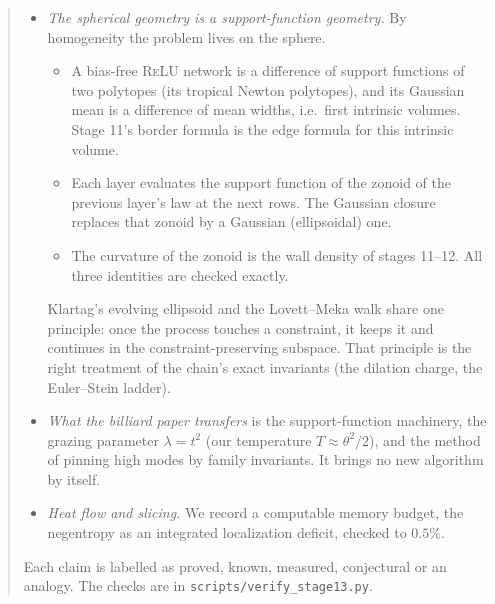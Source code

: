\documentclass[11pt]{article}
\theoremstyle{plain}
\theoremstyle{definition}\newtheorem{definition}[theorem]{Definition}\newtheorem{remark}[theorem]{Remark}
\begin{document}
\begin{abstract}
\begin{itemize}[leftmargin=*]
\begin{itemize}
\item Stage 12's increment law gives its size: across-input log-norm increments $\frac4n(\frac32-\frac{J_2(\theta)}{2\pi})\approx4\theta^2/n$, which
saturate. This answers the open item of note XLIV with a parameter-free leading law: $0.0058$--$0.0072$ at layers $8$--$14$,
against measured $0.0077$--$0.0100$; the input radius gives $1/(2n)$.
\item The gain need not mean-revert to explain the plateau. A falsifiable prediction separates the two readings.
\item The Edgeworth-corrected Gaussian closure is exact to $O(\varepsilon^2)$ on a scale mixture when it carries the mixture's own
skewness $6\varepsilon r$ and kurtosis $12\varepsilon$ (checked: halving $\varepsilon$ cuts the error by $3.8$--$4.0$).
\end{itemize}
So the critical mode leaks into the means only through inconsistency between the chain's carried variance, $\kappa_3$ and
$\kappa_4$ along the dilation. A dilation-consistent (scale-mixture) closure removes the leak at $O(n^2)$ per layer.
\item \emph{The spherical geometry is a support-function geometry.} By homogeneity the problem lives on the sphere.
\begin{itemize}
\item A bias-free \textsc{ReLU} network is a difference of support functions of two polytopes (its tropical Newton polytopes),
and its Gaussian mean is a difference of mean widths, i.e.\ first intrinsic volumes. Stage 11's border formula is the edge
formula for this intrinsic volume.
\item Each layer evaluates the support function of the zonoid of the previous layer's law at the next rows. The Gaussian
closure replaces that zonoid by a Gaussian (ellipsoidal) one.
\item The curvature of the zonoid is the wall density of stages 11--12. All three identities are checked exactly.
\end{itemize}
Klartag's evolving ellipsoid and the Lovett--Meka walk share one principle: once the process touches a constraint, it keeps it
and continues in the constraint-preserving subspace. That principle is the right treatment of the chain's exact invariants (the
dilation charge, the Euler--Stein ladder).
\item \emph{What the billiard paper transfers} is the support-function machinery, the grazing parameter $\lambda=t^2$ (our
temperature $T\approx\theta^2/2$), and the method of pinning high modes by family invariants. It brings no new algorithm by itself.
\item \emph{Heat flow and slicing.} We record a computable memory budget, the negentropy as an integrated localization
deficit, checked to $0.5\%$.
\end{itemize}
Each claim is labelled as proved, known, measured, conjectural or an analogy. The checks are in \texttt{scripts/verify\_stage13.py}.
\end{abstract}
\tableofcontents
\end{document}
